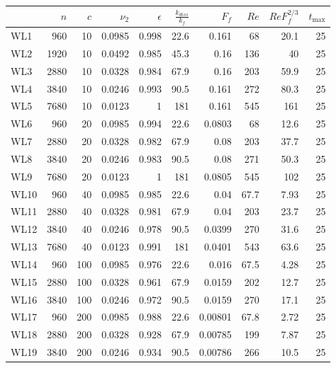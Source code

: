 \begin{tabular}{lrrrrrrrrr}
\toprule
{} &  $n$ &  $c$ &  $\nu_2$ &  $\epsilon$ &  $\frac{k_{diss}}{k_f}$ &   $F_f$ &  $Re$ &  $ReF_f^{2/3}$ &  $t_{\max}$ \\
\midrule
WL1  &  960 &   10 &   0.0985 &       0.998 &                    22.6 &   0.161 &    68 &           20.1 &          25 \\
WL2  & 1920 &   10 &   0.0492 &       0.985 &                    45.3 &    0.16 &   136 &             40 &          25 \\
WL3  & 2880 &   10 &   0.0328 &       0.984 &                    67.9 &    0.16 &   203 &           59.9 &          25 \\
WL4  & 3840 &   10 &   0.0246 &       0.993 &                    90.5 &   0.161 &   272 &           80.3 &          25 \\
WL5  & 7680 &   10 &   0.0123 &           1 &                     181 &   0.161 &   545 &            161 &          25 \\
WL6  &  960 &   20 &   0.0985 &       0.994 &                    22.6 &  0.0803 &    68 &           12.6 &          25 \\
WL7  & 2880 &   20 &   0.0328 &       0.982 &                    67.9 &    0.08 &   203 &           37.7 &          25 \\
WL8  & 3840 &   20 &   0.0246 &       0.983 &                    90.5 &    0.08 &   271 &           50.3 &          25 \\
WL9  & 7680 &   20 &   0.0123 &           1 &                     181 &  0.0805 &   545 &            102 &          25 \\
WL10 &  960 &   40 &   0.0985 &       0.985 &                    22.6 &    0.04 &  67.7 &           7.93 &          25 \\
WL11 & 2880 &   40 &   0.0328 &       0.981 &                    67.9 &    0.04 &   203 &           23.7 &          25 \\
WL12 & 3840 &   40 &   0.0246 &       0.978 &                    90.5 &  0.0399 &   270 &           31.6 &          25 \\
WL13 & 7680 &   40 &   0.0123 &       0.991 &                     181 &  0.0401 &   543 &           63.6 &          25 \\
WL14 &  960 &  100 &   0.0985 &       0.976 &                    22.6 &   0.016 &  67.5 &           4.28 &          25 \\
WL15 & 2880 &  100 &   0.0328 &       0.961 &                    67.9 &  0.0159 &   202 &           12.7 &          25 \\
WL16 & 3840 &  100 &   0.0246 &       0.972 &                    90.5 &  0.0159 &   270 &           17.1 &          25 \\
WL17 &  960 &  200 &   0.0985 &       0.988 &                    22.6 & 0.00801 &  67.8 &           2.72 &          25 \\
WL18 & 2880 &  200 &   0.0328 &       0.928 &                    67.9 & 0.00785 &   199 &           7.87 &          25 \\
WL19 & 3840 &  200 &   0.0246 &       0.934 &                    90.5 & 0.00786 &   266 &           10.5 &          25 \\
\bottomrule
\end{tabular}
